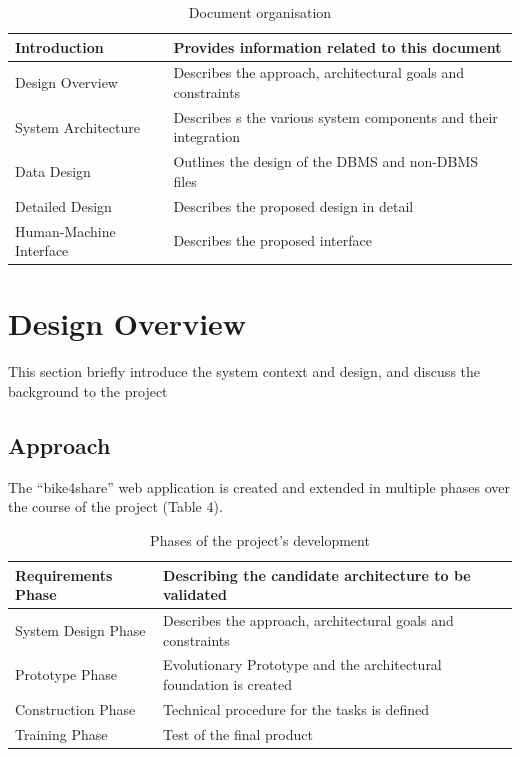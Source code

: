 \documentclass{article}
\begin{document}
\begin{table} [H]
    \begin{center}
        \begin{tabular}{|l|p{}|}
            \hline
            Introduction &   Provides information related to this document         \\ 
            \hline
            Design Overview &  
            Describes the approach, architectural goals and constraints \\
            \hline
            System Architecture &  
            Describes s the various system components and their integration \\
            \hline
            Data Design & Outlines the design of the DBMS and non-DBMS files \\
            \hline
            Detailed Design & Describes the proposed design in detail 
            \\
            \hline
             Human-Machine Interface & Describes the proposed interface
            \\
            \hline
        \end{tabular}
    \end{center}
\caption{Document organisation}
\end{table}
\newpage
\section{Design Overview}
This section briefly introduce the system context and design, and discuss the background to the project
\subsection{Approach}
The “bike4share” web application is created and extended in multiple phases over the course of the project (Table 4).
\begin{table} [H]
    \begin{center}
        \begin{tabular}{|l|p{}|}
            \hline
            Requirements Phase &   Describing the candidate architecture to be validated         \\
            \hline
            System Design Phase &  
            Describes the approach, architectural goals and constraints \\
            \hline
            Prototype Phase &  
            Evolutionary Prototype and the architectural foundation is created    \\
            \hline
            Construction Phase & Technical procedure for the tasks is defined \\
            \hline
            Training Phase & Test of the final product
            \\
            \hline
        \end{tabular}
    \end{center}
\caption{Phases of the project's development}
\end{table}
\end{document}
